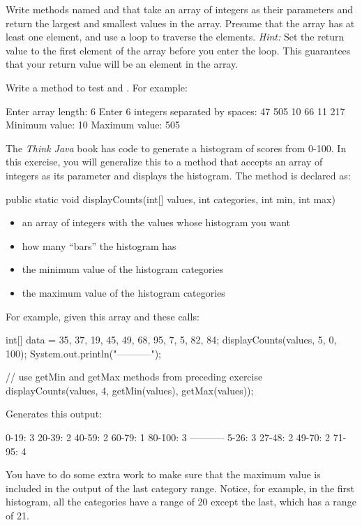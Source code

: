 \begin{exercise}
Write methods named  and  that take an array of integers as their parameters and return the largest and smallest values in the array. Presume that the array has at least one element, and use a loop to traverse the elements.  {\em Hint:} Set the return value to the first element of the array before you enter the loop. This guarantees that your return value will be an element in the array.

Write a  method to test  and . For example:

\begin{stdout}
Enter array length: 6
Enter 6 integers separated by spaces: 47 505 10 66 11 217
Minimum value: 10
Maximum value: 505
\end{stdout}

\end{exercise}

\begin{exercise}
The {\em Think Java} book has code to generate a histogram of scores from 0-100. In this exercise, you will generalize this to a method that accepts an array of integers as its parameter and displays the histogram.  The method is declared as:

\begin{code}
public static void displayCounts(int[] values,
     int categories, int min, int max)
\end{code}

\begin{itemize}
\item {} an array of integers with the values whose histogram you want
\item {} how many ``bars'' the histogram has
\item {} the minimum value of the histogram categories
\item {} the maximum value of the histogram categories
\end{itemize}

For example, given this array and these calls:

\begin{code}
int[] data =  {35, 37, 19, 45, 49, 68, 95, 7, 5, 82, 84};
displayCounts(values, 5, 0, 100);
System.out.println("-----------");

// use getMin and getMax methods from preceding exercise
displayCounts(values, 4, getMin(values), getMax(values));
\end{code}

Generates this output:

\begin{stdout}
0-19: 3
20-39: 2
40-59: 2
60-79: 1
80-100: 3
-----------
5-26: 3
27-48: 2
49-70: 2
71-95: 4
\end{stdout}

You have to do some extra work to make sure that the maximum value is included in the output of the last category range. Notice, for example, in the first histogram, all the categories have a range of 20 except the last, which has a range of 21.
\end{exercise}

